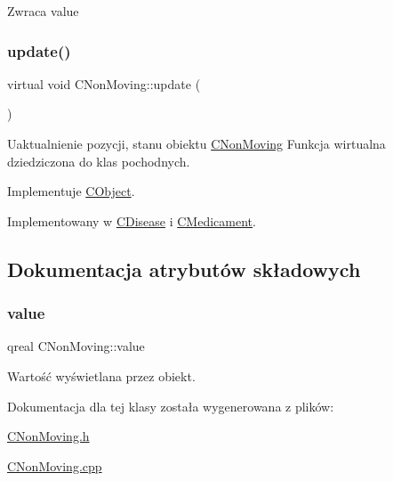 \begin{DoxyReturn}{Zwraca}
value 
\end{DoxyReturn}
\mbox{\label{class_c_non_moving_ad17a839c59eb2639623e863a3d6c8740}} 
\subsubsection{\texorpdfstring{update()}{update()}}
{\footnotesize\ttfamily virtual void C\+Non\+Moving\+::update (\begin{DoxyParamCaption}{ }\end{DoxyParamCaption})\hspace{0.3cm}{\ttfamily [pure virtual]}}



Uaktualnienie pozycji, stanu obiektu \mbox{\hyperlink{class_c_non_moving}{C\+Non\+Moving}} Funkcja wirtualna dziedziczona do klas pochodnych. 



Implementuje \mbox{\hyperlink{class_c_object_acb42ca516e836d0267ddb9a0556916a9}{C\+Object}}.



Implementowany w \mbox{\hyperlink{class_c_disease_a2f8e7ad1e743ace0540a09a6f620d6d7}{C\+Disease}} i \mbox{\hyperlink{class_c_medicament_a3568bc88e5fa9db63e82fcad13ce90eb}{C\+Medicament}}.



\subsection{Dokumentacja atrybutów składowych}
\mbox{\label{class_c_non_moving_a822c4674c5e6d53b11bf135f5d2d42bd}} 
\subsubsection{\texorpdfstring{value}{value}}
{\footnotesize\ttfamily qreal C\+Non\+Moving\+::value\hspace{0.3cm}{\ttfamily [protected]}}



Wartość wyświetlana przez obiekt. 



Dokumentacja dla tej klasy została wygenerowana z plików\+:\begin{DoxyCompactItemize}
\item 
\mbox{\hyperlink{_c_non_moving_8h}{C\+Non\+Moving.\+h}}\item 
\mbox{\hyperlink{_c_non_moving_8cpp}{C\+Non\+Moving.\+cpp}}\end{DoxyCompactItemize}
